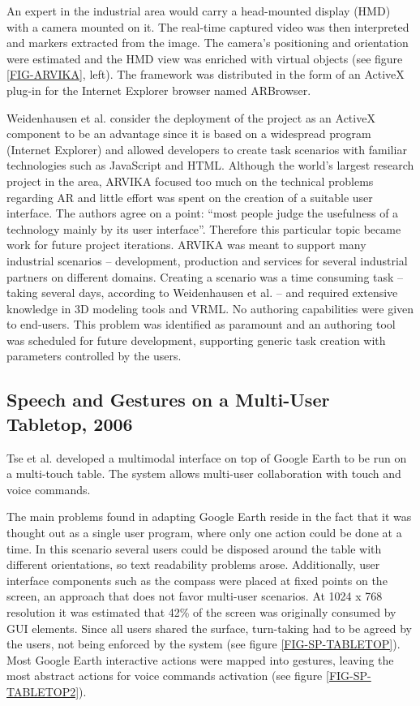 An expert in the industrial area would carry a head-mounted display (HMD) with a camera mounted on it.
The real-time captured video was then interpreted and markers extracted from the image.
The camera's positioning and orientation were estimated and the HMD view was enriched with virtual objects
(see figure \ref{FIG-ARVIKA}, left).
The framework was distributed in the form of an ActiveX plug-in for the Internet Explorer browser
named ARBrowser.


Weidenhausen et al. \cite{ARVIKA-LESSONS} consider the deployment of the project as an ActiveX component
to be an advantage since it is based on a widespread program (Internet Explorer) and allowed developers
to create task scenarios with familiar technologies such as JavaScript and HTML.
Although the world's largest research project in the area, ARVIKA focused too much on the technical problems
regarding AR and little effort was spent on the creation of a suitable user interface.
The authors agree on a point: ``most people judge the usefulness of a technology mainly by its user interface''.
Therefore this particular topic became work for future project iterations.
ARVIKA was meant to support many industrial scenarios -- development, production and services for several
industrial partners on different domains.
Creating a scenario was a time consuming task -- taking several days, according to Weidenhausen et al.
-- and required extensive knowledge in 3D modeling tools and VRML. No authoring capabilities were given to end-users.
This problem was identified as paramount and an authoring tool was scheduled for future development,
supporting generic task creation with parameters controlled by the users.



\subsection{Speech and Gestures on a Multi-User Tabletop, 2006}

Tse et al. \cite{SP-GEST-TTOP} developed a multimodal interface on top of Google Earth \cite{SITE-EARTH}
to be run on a multi-touch table.
The system allows multi-user collaboration with touch and voice commands.

The main problems found in adapting Google Earth reside in the fact that it was thought out as a single user program,
where only one action could be done at a time.
In this scenario several users could be disposed around the table with different orientations,
so text readability problems arose.
Additionally, user interface components such as the compass were placed at fixed points on the screen,
an approach that does not favor multi-user scenarios.
At 1024 x 768 resolution it was estimated that 42\% of the screen was originally consumed by GUI elements.
Since all users shared the surface, turn-taking had to be agreed by the users,
not being enforced by the system (see figure \ref{FIG-SP-TABLETOP}).
Most Google Earth interactive actions were mapped into gestures,
leaving the most abstract actions for voice commands activation (see figure \ref{FIG-SP-TABLETOP2}).


